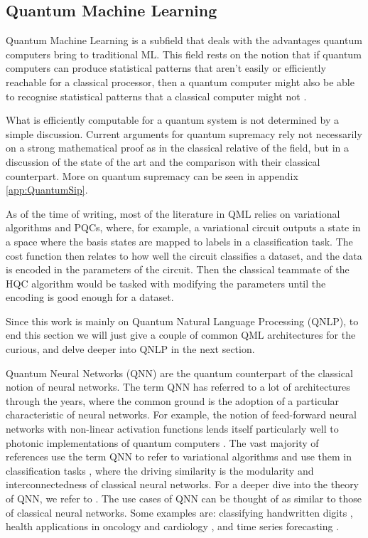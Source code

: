 \subsection{Quantum Machine Learning}

Quantum Machine Learning is a subfield that deals with the advantages quantum computers bring to traditional ML. This field rests on the notion that if quantum computers can produce statistical patterns that aren't easily or efficiently reachable for a classical processor, then a quantum computer might also be able to recognise statistical patterns that a classical computer might not \cite{biamonte_quantum_2017}.

What is efficiently computable for a quantum system is not determined by a simple discussion. Current arguments for quantum supremacy rely not necessarily on a strong mathematical proof as in the classical relative of the field, but in a discussion of the state of the art and the comparison with their classical counterpart. More on quantum supremacy can be seen in appendix \ref{app:QuantumSip}.

As of the time of writing, most of the literature in QML relies on variational algorithms and PQCs, where, for example, a variational circuit outputs a state in a space where the basis states are mapped to labels in a classification task. The cost function then relates to how well the circuit classifies a dataset, and the data is encoded in the parameters of the circuit. Then the classical teammate of the HQC algorithm would be tasked with modifying the parameters until the encoding is good enough for a dataset.

Since this work is mainly on Quantum Natural Language Processing (QNLP), to end this section we will just give a couple of common QML architectures for the curious, and delve deeper into QNLP in the next section.

Quantum Neural Networks (QNN) are the quantum counterpart of the classical notion of neural networks. The term QNN has referred to a lot of architectures through the years, where the common ground is the adoption of a particular characteristic of neural networks. For example, the notion of feed-forward neural networks with non-linear activation functions lends itself particularly well to photonic implementations of quantum computers \cite{killoran_continuous-variable_2019,steinbrecher_quantum_2018}. The vast majority of references use the term QNN to refer to variational algorithms and use them in classification tasks \cite{farhi_classification_2018}, where the driving similarity is the modularity and interconnectedness of classical neural networks. For a deeper dive into the theory of QNN, we refer to \cite{schuld_quest_2014}. The use cases of QNN can be thought of as similar to those of classical neural networks. Some examples are: classifying handwritten digits \cite{zhou_recognition_1999}, health applications in oncology \cite{li_model_2014} and cardiology \cite{jie_zhou_automatic_2003}, and time series forecasting \cite{azevedo_time_2007}.

